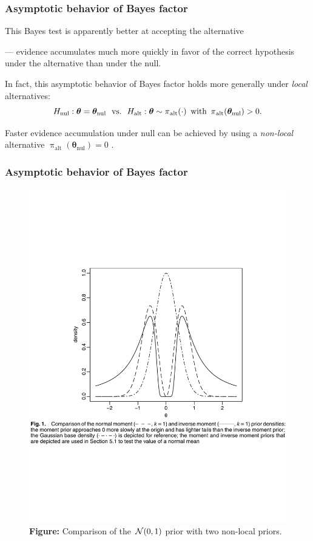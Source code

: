 \documentclass[18pt, handout]{beamer}
\newcommand{\defineTightSpacing}{%
	\setlength{\abovedisplayskip}{.25\baselineskip}%
	\setlength{\belowdisplayskip}{.25\baselineskip}%
}
\newcommand{\thinnerspace}{\mskip.5\thinmuskip}
\newcommand{\normalDist}{\operatorname{\mathcal{N}}}
\newcommand{\density}{\operatorname{\pi}}
\newcommand{\btheta}{\bm{\theta}}
\newcommand{\hypothesis}{H}
\newcommand{\nullSub}{\mathrm{nul}}
\newcommand{\altSub}{\mathrm{alt}}
\begin{document}
\begin{frame}
\frametitle{Asymptotic behavior of Bayes factor}
This Bayes test is apparently better at accepting the alternative

--- evidence accumulates much more quickly in favor of the correct hypothesis under the alternative than under the null.

\smallskip
In fact, this asymptotic behavior of Bayes factor holds more generally under \textit{local} alternatives:
\begin{equation*} \defineTightSpacing%
\hypothesis_\nullSub: \btheta = \btheta_\nullSub
	\ \text{ vs.\ } \ 
\hypothesis_\altSub: \btheta \sim \density_\altSub(\cdot)
	\, \text{ with } \density_\altSub(\btheta_\nullSub) > 0.
\end{equation*}

Faster evidence accumulation under null can be achieved by using a \textit{non-local} alternative $\density_\altSub(\btheta_\nullSub) = 0$ \citep{johnson2010nonlocal}.
\end{frame}


\begin{frame}
\frametitle{Asymptotic behavior of Bayes factor}
\begin{figure}
\centering
\includegraphics[width=.9\linewidth]{Figure/non_local_prior}
\caption*{\textcolor{themecolor}{\textbf{Figure:}}
	Comparison of the $\thinnerspace \normalDist(0, 1)$ prior with two  non-local priors.
}
\end{figure}
\end{frame}
\end{document}
